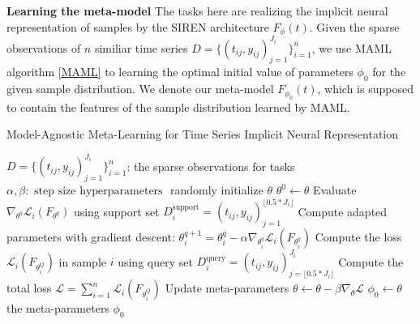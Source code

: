 \documentclass{article}
\begin{document}
\textbf{Learning the meta-model}
The tasks here are realizing the implicit neural representation of samples by the SIREN architecture $F_\phi(t)$.
Given the sparse observations of $n$ similiar time series $D=\{(t_{ij},y_{ij})_{j=1}^{J_i}\}_{i=1}^n$,
we use MAML algorithm \ref{MAML} to learning the optimal initial value of parameters $\phi_0$ for the given sample distribution.
We denote our meta-model $F_{\phi_0}(t)$, which is supposed to contain the features of the sample distribution learned by MAML.


\begin{algorithm}[htb]
	\renewcommand{\algorithmicrequire}{\textbf{Input:}}
	\renewcommand{\algorithmicensure}{\textbf{Output:}}
	\caption{Model-Agnostic Meta-Learning for Time Series Implicit Neural Representation}
	\label{MAML}
	\begin{algorithmic}
    \REQUIRE $D=\{(t_{ij},y_{ij})_{j=1}^{J_i}\}_{i=1}^n$: the sparse observations for tasks
    \REQUIRE $\alpha, \beta: \text { step size hyperparameters }$
		\STATE randomly initialize $\theta$
        \STATE $\theta^0 \gets \theta$
          \STATE Evaluate $\nabla_{\theta^q} \mathcal{L}_{i}\left(F_{\theta^q}\right)$ using support set $D_i^{\text{support}}=(t_{ij},y_{ij})_{j=1}^{\lfloor 0.5*J_i\rfloor }$
          \STATE Compute adapted parameters with gradient descent:
          $\theta_i^{q+1}=\theta_i^q-\alpha \nabla_{\theta_i^q} \mathcal{L}_{i}\left(F_{\theta_i^q}\right)$
        \ENDFOR
        \STATE Compute the loss $\mathcal{L}_{i}\left(F_{\theta_i^Q}\right)$ in sample $i$ using query set $D_i^{\text{query}}=(t_{ij},y_{ij})_{j=\lfloor 0.5*J_i\rfloor }^{J_i}$
      \ENDFOR
      \STATE Compute the total loss $\mathcal{L} = \sum_{i=1}^n \mathcal{L}_{i}\left(F_{\theta_i^Q}\right)$
      \STATE Update meta-parameters $\theta \leftarrow \theta-\beta \nabla_\theta \mathcal{L} $
    \ENDWHILE 
    \STATE $\phi_0 \gets \theta$
		\ENSURE the meta-parameters $\phi_0$
  \end{algorithmic}  
\end{algorithm}
\end{document}
